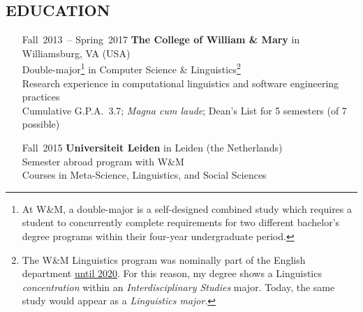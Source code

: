 \documentclass{res}     %
\begin{document}
\begin{resume}
\section{EDUCATION}
\vspace{5mm}
\begin{itemize}[font=\itshape,align=parleft,labelwidth=3cm,leftmargin=2cm]
    \item[Fall~2013~-- Spring~2017]
        \textbf{The College of William \& Mary} in Williamsburg, VA (USA)
        \\ Double-major\footnote{At W\&M, a double-major is a self-designed combined study which requires a student to concurrently complete requirements for two different bachelor's degree programs within their four-year undergraduate period.} in Computer Science \& Linguistics\footnote{The W\&M Linguistics program was nominally part of the English department \href{https://www.wm.edu/news/stories/2020/wm-first-in-virginia-to-offer-bachelors-degree-in-linguistics.php}{until 2020}. For this reason, my degree shows a Linguistics \emph{concentration} within an \emph{Interdisciplinary Studies} major. Today, the same study would appear as a \emph{Linguistics major}.}
        \\ Research experience in computational linguistics and software engineering practices
        \\ Cumulative G.P.A.\ 3.7; \textit{Magna cum laude}; Dean's List for 5 semesters (of 7 possible)
    \item[Fall~2015]
        \textbf{Universiteit Leiden} in Leiden (the Netherlands)
        \\ Semester abroad program with W\&M
        \\ Courses in Meta-Science, Linguistics, and Social Sciences
\end{itemize}


\end{resume}
\end{document}
